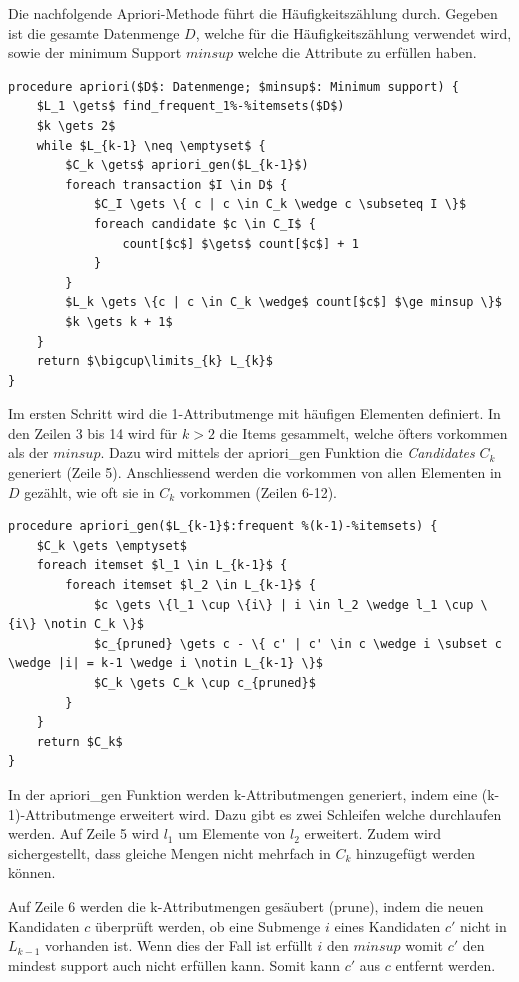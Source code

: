 Die nachfolgende Apriori-Methode führt die Häufigkeitszählung durch.
Gegeben ist die gesamte Datenmenge $D$, welche für die Häufigkeitszählung verwendet wird, sowie der minimum Support $minsup$ welche die Attribute zu erfüllen haben.
\begin{lstlisting}[language=pseudocode]
procedure apriori($D$: Datenmenge; $minsup$: Minimum support) {
	$L_1 \gets$ find_frequent_1%-%itemsets($D$)
	$k \gets 2$
	while $L_{k-1} \neq \emptyset$ {
		$C_k \gets$ apriori_gen($L_{k-1}$)
		foreach transaction $I \in D$ {
			$C_I \gets \{ c | c \in C_k \wedge c \subseteq I \}$
			foreach candidate $c \in C_I$ {
				count[$c$] $\gets$ count[$c$] + 1
			}
		}
		$L_k \gets \{c | c \in C_k \wedge$ count[$c$] $\ge minsup \}$
		$k \gets k + 1$
	}
	return $\bigcup\limits_{k} L_{k}$
}
\end{lstlisting}
Im ersten Schritt wird die 1-Attributmenge mit häufigen Elementen definiert. In den Zeilen 3 bis 14 wird für $k > 2$ die Items gesammelt, welche öfters vorkommen als der $minsup$. Dazu wird mittels der apriori\_gen Funktion die \textit{Candidates} $C_k$ generiert (Zeile 5).
Anschliessend werden die vorkommen von allen Elementen in $D$ gezählt, wie oft sie in $C_k$ vorkommen (Zeilen 6-12).


\begin{lstlisting}[language=pseudocode]
procedure apriori_gen($L_{k-1}$:frequent %(k-1)-%itemsets) {
	$C_k \gets \emptyset$
	foreach itemset $l_1 \in L_{k-1}$ {
		foreach itemset $l_2 \in L_{k-1}$ {
			$c \gets \{l_1 \cup \{i\} | i \in l_2 \wedge l_1 \cup \{i\} \notin C_k \}$
			$c_{pruned} \gets c - \{ c' | c' \in c \wedge i \subset c \wedge |i| = k-1 \wedge i \notin L_{k-1} \}$
			$C_k \gets C_k \cup c_{pruned}$
		}
	}
	return $C_k$
}
\end{lstlisting}
In der apriori\_gen Funktion werden k-Attributmengen generiert, indem eine (k-1)-Attributmenge erweitert wird. Dazu gibt es zwei Schleifen welche durchlaufen werden. Auf Zeile 5 wird $l_1$ um Elemente von $l_2$ erweitert. Zudem wird sichergestellt, dass gleiche Mengen nicht mehrfach in $C_k$ hinzugefügt werden können.

Auf Zeile 6 werden die k-Attributmengen gesäubert (prune), indem die neuen Kandidaten $c$ überprüft werden, ob eine Submenge $i$ eines Kandidaten $c'$ nicht in $L_{k-1}$ vorhanden ist. Wenn dies der Fall ist erfüllt $i$ den $minsup$ womit $c'$ den mindest support auch nicht erfüllen kann. Somit kann $c'$ aus $c$ entfernt werden.


